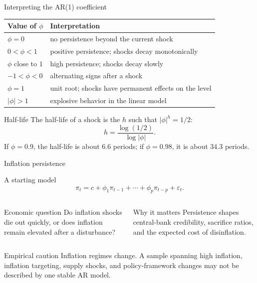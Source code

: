 \documentclass[10pt]{beamer}
\newcommand{\eps}{\varepsilon}
\begin{document}
\begin{frame}{Interpreting the AR(1) coefficient}
\small
\begin{tabularx}{\textwidth}{p{}Y}
\toprule
Value of $\phi$ & Interpretation \\
\midrule
$\phi=0$ & no persistence beyond the current shock \\
$0<\phi<1$ & positive persistence; shocks decay monotonically \\
$\phi$ close to $1$ & high persistence; shocks decay slowly \\
$-1<\phi<0$ & alternating signs after a shock \\
$\phi=1$ & unit root; shocks have permanent effects on the level \\
$|\phi|>1$ & explosive behavior in the linear model \\
\bottomrule
\end{tabularx}

\pause
\begin{exampleblock}{Half-life}
The half-life of a shock is the $h$ such that $|\phi|^h=1/2$:
\[
h=\frac{\log(1/2)}{\log|\phi|}.
\]
If $\phi=0.9$, the half-life is about $6.6$ periods; if $\phi=0.98$, it is about $34.3$ periods.
\end{exampleblock}
\end{frame}

\begin{frame}{Inflation persistence}
\small
\begin{block}{A starting model}
\[
\pi_t=c+\phi_1\pi_{t-1}+\cdots+\phi_p\pi_{t-p}+\eps_t.
\]
\end{block}

\begin{columns}[T]
\begin{column}{0.49\textwidth}
\begin{exampleblock}{Economic question}
Do inflation shocks die out quickly, or does inflation remain elevated after a disturbance?
\end{exampleblock}
\end{column}
\begin{column}{0.49\textwidth}
\begin{alertblock}{Why it matters}
Persistence shapes central-bank credibility, sacrifice ratios, and the expected cost of disinflation.
\end{alertblock}
\end{column}
\end{columns}

\pause
\begin{alertblock}{Empirical caution}
Inflation regimes change. A sample spanning high inflation, inflation targeting, supply shocks, and policy-framework changes may not be described by one stable AR model.
\end{alertblock}
\end{frame}
\end{document}
